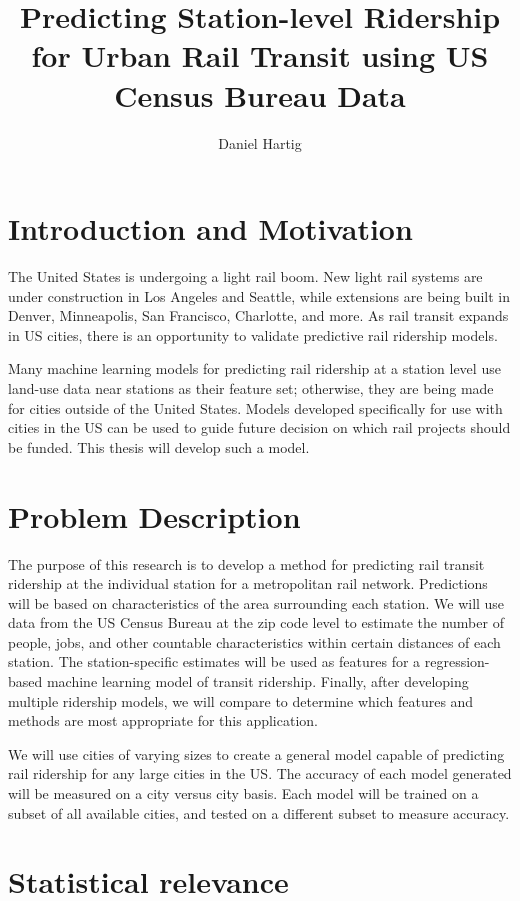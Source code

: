 \documentclass{article}
\title{Predicting Station-level Ridership for Urban Rail Transit using US Census Bureau Data}
\author{Daniel Hartig}
\begin{document}
\maketitle

\section{Introduction and Motivation}

The United States is undergoing a light rail boom. New light rail systems are under construction in Los Angeles and Seattle, while extensions are being built in Denver, Minneapolis, San Francisco, Charlotte, and more. As rail transit expands in US cities, there is an opportunity to validate predictive rail ridership models. 

Many machine learning models for predicting rail ridership at a station level use land-use data near stations as their feature set; otherwise, they are being made for cities outside of the United States. Models developed specifically for use with cities in the US can be used to guide future decision on which rail projects should be funded. This thesis will develop such a model.

\section{Problem Description}

The purpose of this research is to develop a method for predicting rail transit ridership at the individual station for a metropolitan rail network. Predictions will be based on characteristics of the area surrounding each station. We will use data from the US Census Bureau at the zip code level to estimate the number of people, jobs, and other countable characteristics within certain distances of each station. The station-specific estimates will be used as features for a regression-based machine learning model of transit ridership. Finally, after developing multiple ridership models, we will compare to determine which features and methods are most appropriate for this application. 

We will use cities of varying sizes to create a general model capable of predicting rail ridership for any large cities in the US. The accuracy of each model generated will be measured on a city versus city basis. Each model will be trained on a subset of all available cities, and tested on a different subset to measure accuracy. 

\section{Statistical relevance}
\end{document}
